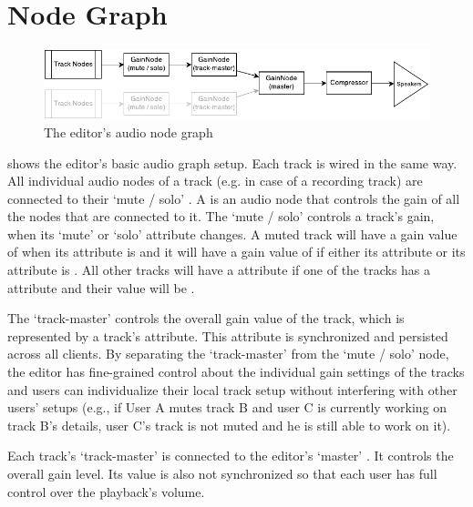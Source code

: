 \section{Node Graph}
\label{impl-node-graph}

\begin{figure}[htb]
  \centerline{\includegraphics[width=\linewidth]{images/Node_Graph.pdf}}
  \caption[The editor's audio node graph]{The editor's audio node graph}
  \label{fig:nodegraph}
\end{figure}

 shows the editor's basic audio graph setup. Each track is wired in the same way. All individual audio nodes of a track (e.g.  in case of a recording track) are connected to their `mute / solo' . A  is an audio node that controls the gain of all the nodes that are connected to it. The `mute / solo'  controls a track's gain, when its `mute' or `solo' attribute changes. A muted track will have a gain value of  when its  attribute is  and it will have a gain value of  if either its  attribute or its  attribute is . All other tracks will have a  attribute if one of the tracks has a  attribute and their  value will be .

The `track-master'  controls the overall gain value of the track, which is represented by a track's  attribute. This attribute is synchronized and persisted across all clients. By separating the `track-master' from the `mute / solo' node, the editor has fine-grained control about the individual gain settings of the tracks and users can individualize their local track setup without interfering with other users' setups (e.g., if User A mutes track B and user C is currently working on track B's details, user C's track is not muted and he is still able to work on it).

Each track's `track-master'  is connected to the editor's `master' . It controls the overall gain level. Its value is also not synchronized so that each user has full control over the playback's volume.

